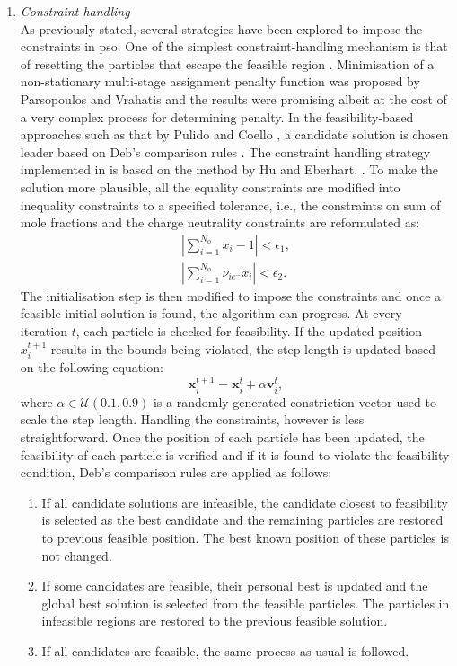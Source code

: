 	\begin{enumerate}
		\item \emph{Constraint handling}\\
			As previously stated, several strategies have been explored to impose the constraints in \gls{pso}. One of the simplest constraint-handling mechanism is that of resetting the particles that escape the feasible region \cite{Hu:2002aa,Guo:2004aa,Sun:2009aa}. Minimisation of a non-stationary multi-stage assignment penalty function was proposed by Parsopoulos and Vrahatis \cite{Parsopoulos:2005aa} and the results were promising albeit at the cost of a very complex process for determining penalty. In the feasibility-based approaches such as that by Pulido and Coello \cite{Pulido:2004aa}, a candidate solution is chosen leader based on Deb's comparison rules \cite{Deb:2000aa}. The constraint handling strategy implemented in {\GEM} is based on the method by Hu and Eberhart. \cite{Hu:2002aa}. To make the solution more plausible, all the equality constraints are modified into inequality constraints to a specified tolerance, i.e., the constraints on sum of mole fractions and the charge neutrality constraints are reformulated as:
			\begin{gather}
				\left | \sum_{i=1}^{N_\phi} x_i - 1 \right | <  \epsilon_1,\\
				\left | \sum_{i=1}^{N_\phi} \nu_{i{e^-}} x_i \right | < \epsilon_2.
			\end{gather} 
			The initialisation step is then modified to impose the constraints and once a feasible initial solution is found, the algorithm can progress. At every iteration $t$, each particle is checked for feasibility. If the updated position $x_i^{t+1}$ results in the bounds being violated, the step length is updated based on the following equation:
			\begin{equation}  \label{eq:PSO_pos_alpha}
				\mathbf{x}_i^{t+1} = \mathbf{x}_i^{t} + \alpha \mathbf{v}_i^{t},
			\end{equation}
			where $\alpha \in \mathcal{U} (0.1, 0.9)$ is a randomly generated constriction vector used to scale the step length. Handling the constraints, however is less straightforward. Once the position of each particle has been updated, the feasibility of each particle is verified and if it is found to violate the feasibility condition, Deb's comparison rules \cite{Deb:2000aa} are applied as follows:
			\begin{enumerate}\compresslist
				\item	If all candidate solutions are infeasible, the candidate closest to feasibility is selected as the best candidate and the remaining particles are restored to previous feasible position. The best known position of these particles is not changed.
				\item If some candidates are feasible, their personal best is updated and the global best solution is selected from the feasible particles. The particles in infeasible regions are restored to the previous feasible solution.
				\item If all candidates are feasible, the same process as usual is followed.
			\end{enumerate}
			

\end{enumerate}
